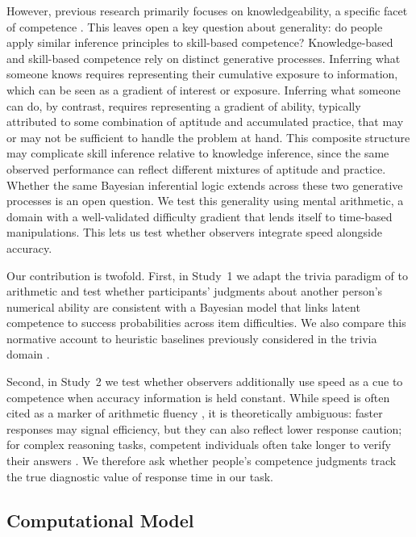 \documentclass[10pt,letterpaper]{article}
\begin{document}
However, previous research primarily focuses on knowledgeability, a specific facet of competence \citep{Aboody-2025,Dubourg-2025,Mercier-2026}. This leaves open a key question about generality: do people apply similar inference principles to skill-based competence? Knowledge-based and skill-based competence rely on distinct generative processes. Inferring what someone knows requires representing their cumulative exposure to information, which can be seen as a gradient of interest or exposure. Inferring what someone can do, by contrast, requires representing a gradient of ability, typically attributed to some combination of aptitude and accumulated practice, that may or may not be sufficient to handle the problem at hand. This composite structure may complicate skill inference relative to knowledge inference, since the same observed performance can reflect different mixtures of aptitude and practice. Whether the same Bayesian inferential logic extends across these two generative processes is an open question. We test this generality using mental arithmetic, a domain with a well-validated difficulty gradient \citep{Dehaene-2011} that lends itself to time-based manipulations. This lets us test whether observers integrate speed alongside accuracy.

Our contribution is twofold. First, in Study~1 we adapt the trivia paradigm of \citet{Dubourg-2025} to arithmetic and test whether participants’ judgments about another person’s numerical ability are consistent with a Bayesian model that links latent competence to success probabilities across item difficulties. We also compare this normative account to heuristic baselines previously considered in the trivia domain \citep{Mercier-2026}. 

Second, in Study~2 we test whether observers additionally use speed as a cue to competence when accuracy information is held constant. While speed is often cited as a marker of arithmetic fluency \citep{Cheng-2021,Roy-2025}, it is theoretically ambiguous: faster responses may signal efficiency, but they can also reflect lower response caution; for complex reasoning tasks, competent individuals often take longer to verify their answers \citep[see][]{Berke-2023,Goldhammer-2011,Kruger-2004,Hedge-2018,Richardson-2022}. We therefore ask whether people’s competence judgments track the true diagnostic value of response time in our task.

\subsection{Computational Model}\label{computational-model}
\end{document}
